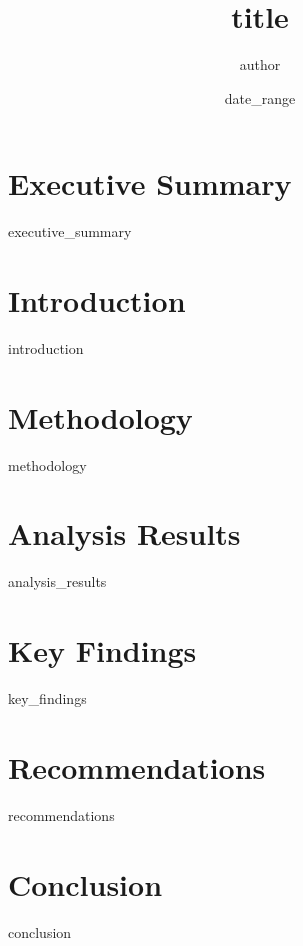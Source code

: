 \documentclass[11pt, a4paper]{article}
\title{\textbf{{{ title }}}}
\author{{{ author }}}
\date{{{ date_range }}}
\begin{document}
\maketitle
\tableofcontents
\newpage

\section{Executive Summary}
{{ executive_summary }}

\section{Introduction}
{{ introduction }}

\section{Methodology}
{{ methodology }}

\section{Analysis Results}
{{ analysis_results }}

\section{Key Findings}
{{ key_findings }}

\section{Recommendations}
{{ recommendations }}

\section{Conclusion}
{{ conclusion }}
\end{document}
